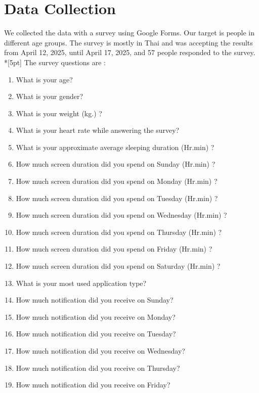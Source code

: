 \chapter*{Data Collection}
We collected the data with a survey using Google Forms. Our target is people in different age groups. The survey is mostly in Thai and was accepting the results from April 12, 2025, until April 17, 2025, and 57 people responded to the survey.\\*[5pt]
The survey questions are : 
\begin{multicols}{2}
    \begin{enumerate}
        \item What is your age?
        \item What is your gender?
        \item What is your weight (kg.) ?
        \item What is your heart rate while answering the survey?
        \item What is your approximate average sleeping duration (Hr.min) ?
        \item How much screen duration did you spend on Sunday (Hr.min) ?
        \item How much screen duration did you spend on Monday (Hr.min) ?
        \item How much screen duration did you spend on Tuesday (Hr.min) ?
        \item How much screen duration did you spend on Wednesday (Hr.min) ?
        \item How much screen duration did you spend on Thursday (Hr.min) ?
        \item How much screen duration did you spend on Friday (Hr.min) ?
        \item How much screen duration did you spend on Saturday (Hr.min) ?
        \item What is your most used application type?
        \item How much notification did you receive on Sunday?
        \item How much notification did you receive on Monday?
        \item How much notification did you receive on Tuesday?
        \item How much notification did you receive on Wednesday?
        \item How much notification did you receive on Thursday?
        \item How much notification did you receive on Friday?

\end{enumerate}
\end{multicols}
